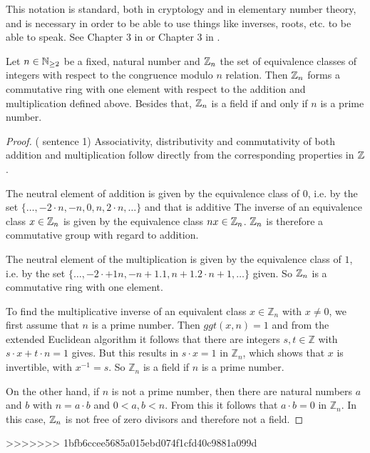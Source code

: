 This notation is standard, both in cryptology and in elementary number theory, and is necessary in order to be able to use things like inverses, roots, etc. to be able to speak. See Chapter 3 in \cite{JB} or Chapter 3 in \cite{AL}.

\begin{theorem}
\label{def: residual class ring}
Let $ n \in \mathbb{N} _{\geq 2} $ be a fixed, natural number and
$ \mathbb{Z}_n $ the set of equivalence classes of integers with respect to the  congruence modulo $ n $ relation. Then $ \mathbb{Z}_n $ forms a commutative ring with one element with respect to the addition and multiplication defined above. Besides that, $\mathbb{Z}_n $ is a field if and only if $ n $ is a prime number.
\end{theorem}
\begin{proof} (\cite{AL} sentence 1) Associativity, distributivity and commutativity of both addition and multiplication follow directly from the corresponding properties in $ \mathbb{Z} $.

The neutral element of addition is given by the equivalence class of $ 0 $, i.e. by the set $ \{\ldots, -2 \cdot n, -n, 0, n, 2 \cdot n, \ldots \} $ and that is additive The inverse of an equivalence class $ x \in \mathbb{Z}_n $ is given by the equivalence class $ nx \in \mathbb{Z}_n $. $ \mathbb{Z}_n $ is therefore a commutative group with regard to addition.

The neutral element of the multiplication is given by the equivalence class of $ 1 $, i.e. by the set $ \{\ldots, -2 \cdot + 1 n, -n + 1.1, n + 1.2 \cdot n + 1, \ldots \} $ given. So $ \mathbb{Z}_n $ is a commutative ring with one element.

To find the multiplicative inverse of an equivalent class $ x \in \mathbb{Z} _n $ with $ x \neq 0 $, we first assume that $ n $ is a prime number. Then $ ggt (x, n) = 1 $ and from the extended Euclidean algorithm it follows that there are integers $ s, t \in \mathbb{Z} $ with $ s \cdot x + t \cdot n = 1 $ gives. But this results in $ s \cdot x = 1 $ in $ \mathbb{Z} _n $, which shows that $ x $ is invertible, with $ x ^{- 1} = s $. So $ \mathbb{Z} _n $ is a field if $ n $ is a prime number.

On the other hand, if $ n $ is not a prime number, then there are natural numbers $ a $ and $ b $ with $ n = a \cdot b $ and $ 0 <a, b <n $. From this it follows that $ a \cdot b = 0 $ in $ \mathbb{Z} _n $. In this case, $ \mathbb{Z}_n $ is not free of zero divisors and therefore not a field.
\end{proof}
>>>>>>> 1bfb6ccee5685a015ebd074f1cfd40c9881a099d
